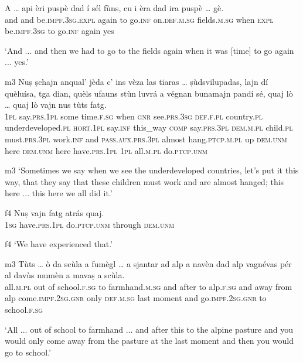 \begin{linenumbers}
	\gll A … api èri puspè dad í sél fùns, cu i èra dad ira puspè … gè.\\
	and {} and be.\textsc{impf.3sg.expl} again to go.\textsc{inf} on.\textsc{def.m.sg} fields.\textsc{m.sg} when \textsc{expl} be.\textsc{impf.3sg} to go.\textsc{inf} again {} yes\\
\end{linenumbers}
\medskip
\glt `And ... and then we had to go to the fields again when it was [time] to go again ... yes.'
\medskip

\begin{linenumbers}
	\gll {\ob}m3{\cb} Nuṣ ṣchajn anqual’ jèda c’ ins vèza las tiaras … ṣùdsvilupadas, lajn dí quèluísa, tga dian, quèls ufauns stùn luvrá a végnan bunamajn pandí sé, quaj lò … quaj lò vajn nus tùts fatg.\\
{} \textsc{1pl} say.\textsc{prs.1pl} some time.\textsc{f.sg} when \textsc{gnr} see.\textsc{prs.3sg} \textsc{def.f.pl} country.\textsc{pl} {} underdeveloped.\textsc{pl} \textsc{hort.1pl} say.\textsc{inf} this\_way \textsc{comp} say.\textsc{prs.3pl} \textsc{dem.m.pl} child.\textsc{pl} must.\textsc{prs.3pl} work.\textsc{inf} and \textsc{pass.aux.prs.3pl} almost hang.\textsc{ptcp.m.pl} up \textsc{dem.unm} here {} \textsc{dem.unm} here have.\textsc{prs.1pl} \textsc{1pl} all.\textsc{m.pl} do.\textsc{ptcp.unm}	\\
\end{linenumbers}
\medskip
\glt {\ob}m3{\cb} `Sometimes we say when we see the underdeveloped countries, let's put it this way, that they say that these children must work and are almost hanged; this here ... this here we all did it.'
\medskip

\begin{linenumbers}
	\gll {\ob}f4{\cb} Nuṣ vajn fatg atrás quaj.\\
	{} \textsc{1sg} have.\textsc{prs.1pl} do\textsc{.ptcp.unm} through \textsc{dem.unm}\\
\end{linenumbers}
\medskip
\glt {\ob}f4{\cb} `We have experienced that.'
\medskip

\begin{linenumbers}
	\gll  {\ob}m3{\cb} Tùts … ò da scùla a fumègl … a sjantar ad alp a navèn dad alp vagnévas pér al davùs mumèn a mavaṣ a scùla. \\
{}	all.\textsc{m.pl} {} out of school.\textsc{f.sg} to farmhand.\textsc{m.sg} {} and after to alp.\textsc{f.sg} and away from alp come.\textsc{impf.2sg.gnr} only \textsc{def.m.sg} last moment and go.\textsc{impf.2sg.gnr} to school.\textsc{f.sg}\\
\end{linenumbers}
\medskip
\glt `All ... out of school to farmhand ... and after this to the alpine pasture and you would only come away from the pasture at the last moment and then you would go to school.'
\medskip


